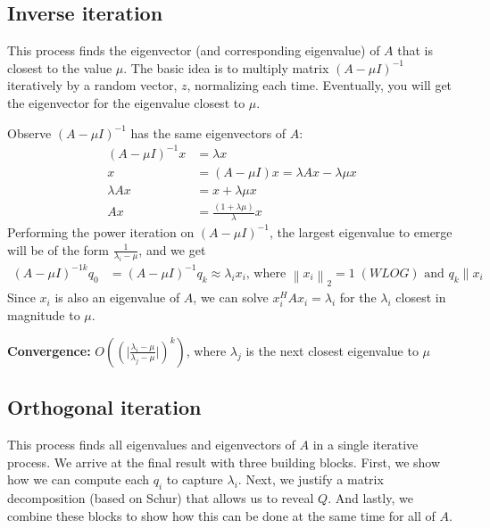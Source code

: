 \documentclass{article}
\newcommand{\norm}[2]{\left\lVert#1\right\rVert_#2}
\newcommand{\abs}[1]{\lvert#1\rvert}
\begin{document}
\subsection{Inverse iteration}
This process finds the eigenvector (and corresponding eigenvalue) of $A$ that is closest to the value $\mu$. The basic idea is to multiply matrix $(A - \mu I)^{-1}$ iteratively by a random vector, $z$, normalizing each time. Eventually, you will get the eigenvector for the eigenvalue closest to $\mu$.

Observe $(A - \mu I)^{-1}$ has the same eigenvectors of $A$:
\begin{align*}
    (A - \mu I)^{-1}x &= \lambda x\\
    x &= (A - \mu I)x = \lambda Ax - \lambda \mu x\\
    \lambda Ax &= x + \lambda \mu x\\
    Ax &= \frac{(1 + \lambda \mu)}{\lambda}x
\end{align*}
Performing the power iteration on $(A - \mu I)^{-1}$, the largest eigenvalue to emerge will be of the form $\frac{1}{\lambda_i - \mu}$, and we get
\begin{align*}
    (A - \mu I)^{-1k}q_0 &= (A - \mu I)^{-1}q_{k} \approx \lambda_i x_i \textrm{, where } \norm{x_i}{2} = 1 \; (WLOG) \textrm{ and } q_k \parallel x_i
\end{align*}
Since $x_i$ is also an eigenvalue of $A$, we can solve $x_i^HAx_i = \lambda_i$ for the $\lambda_i$ closest in magnitude to $\mu$.

\textbf{Convergence: } $O((\abs{\frac{\lambda_i - \mu}{\lambda_j - \mu}})^k)$, where $\lambda_j$ is the next closest eigenvalue to $\mu$

\subsection{Orthogonal iteration}
This process finds all eigenvalues and eigenvectors of $A$ in a single iterative process. We arrive at the final result with three building blocks. First, we show how we can compute each $q_i$ to capture $\lambda_i$. Next, we justify a matrix decomposition (based on Schur) that allows us to reveal $Q$. And lastly, we combine these blocks to show how this can be done at the same time for all of $A$.
\end{document}

